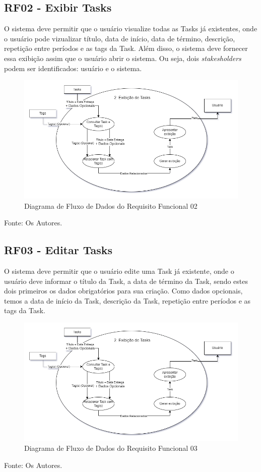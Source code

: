 \documentclass[a4paper,12pt]{article}
\begin{document}
\subsection{RF02 - Exibir Tasks}
O sistema deve permitir que o usuário visualize todas as {Tasks} já existentes, onde o usuário pode vizualizar 
título, data de início, data de término, descrição, repetição entre períodos e as tags da {Task}. Além disso, o 
sistema deve fornecer essa exibição assim que o usuário abrir o sistema. Ou seja, dois \textit{stakesholders} 
podem ser identificados: usuário e o sistema.
\begin{figure}[H]
	\centering
	\includegraphics[scale=0.45]{DFDs/RF02.drawio.png}
	\caption{Diagrama de Fluxo de Dados do Requisito Funcional 02}
\end{figure}
\noindent Fonte: Os Autores.

\pagebreak
\subsection{RF03 - Editar Tasks}
O sistema deve permitir que o usuário edite uma {Task} já existente, onde o usuário deve informar o 
título da {Task}, a data de término da {Task}, sendo estes dois primeiros os dados obrigatórios 
para sua criação. Como dados opcionais, temos a data de início da {Task}, descrição da {Task}, 
repetição entre períodos e as tags da {Task}.
\begin{figure}[H]
	\centering
	\includegraphics[scale=0.45]{DFDs/RF02.drawio.png}
	\caption{Diagrama de Fluxo de Dados do Requisito Funcional 03}
\end{figure}
\noindent Fonte: Os Autores.
\end{document}
